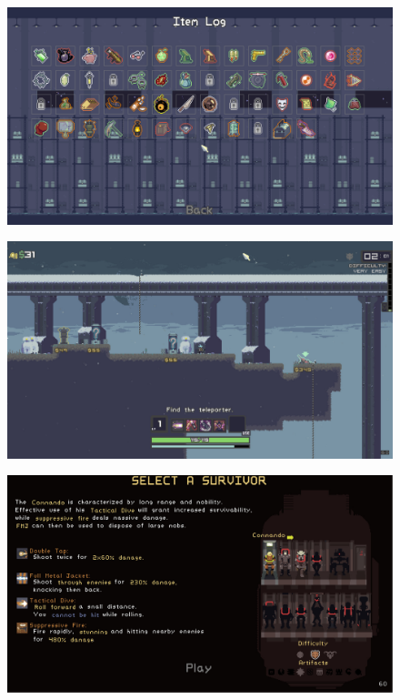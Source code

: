 \begin{figure}[H]
    \centering
    \begin{minipage}{0.43\textwidth}
        \centering
        \includegraphics[width=1.0\textwidth]{Cuerpo/4/RoR1.png} %
        \label{RoR-Objetos}
    \end{minipage}\hfill
    \begin{minipage}{0.43\textwidth}
        \centering
        \includegraphics[width=1.0\textwidth]{Cuerpo/4/RoR2.jpg} %
        \label{RoR-Nivel}
    \end{minipage}
    \centering
    \begin{minipage}{0.43\textwidth}
        \centering
        \includegraphics[width=1.0\textwidth]{Cuerpo/4/RoR3.jpg} %

\end{minipage}
\end{figure}
